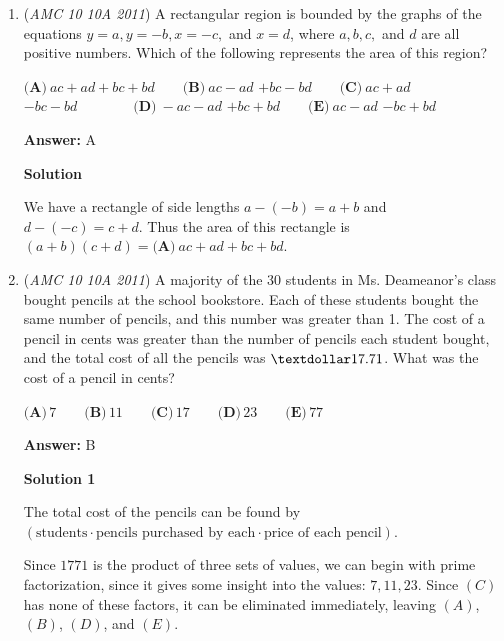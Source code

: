 \begin{enumerate}
 



\textbf{Solution 2}

WLOG, suppose there were 100 birds in total living on Town Lake, then 30 were geese, 25 were swans, 10 were herons, and 35 were ducks. $100-25 = 75$ of the birds are not swans and 30 of these are geese, so the answer is $\frac{30}{75} \times 100 = \boxed{40 \%(C)}$.

 


 


	\item (\textit{AMC 10 10A 2011}) A rectangular region is bounded by the graphs of the equations $y=a, y=-b, x=-c,$ and $x=d$, where $a,b,c,$ and $d$ are all positive numbers. Which of the following represents the area of this region?


 $\textbf{(A)}\ ac+ad+bc+bd\qquad\textbf{(B)}\ ac-ad$ $+bc-bd\qquad\textbf{(C)}\ ac+ad$ $-bc-bd   \quad\quad\qquad\textbf{(D)}\ -ac-ad$ $+bc+bd\qquad\textbf{(E)}\ ac-ad$ $-bc+bd$

 \textbf{Answer: }A



\textbf{Solution}

We have a rectangle of side lengths $a-(-b)=a+b$ and $d-(-c)=c+d.$ Thus the area of this rectangle is $(a + b)(c + d) = \boxed{\textbf{(A)}\ ac + ad + bc + bd}$.

 


	\item (\textit{AMC 10 10A 2011}) A majority of the 30 students in Ms. Deameanor's class bought pencils at the school bookstore.  Each of these students bought the same number of pencils, and this number was greater than 1.  The cost of a pencil in cents was greater than the number of pencils each student bought, and the total cost of all the pencils was $\textdollar 17.71$.  What was the cost of a pencil in cents?


 $\textbf{(A)}\,7 \qquad\textbf{(B)}\,11 \qquad\textbf{(C)}\,17 \qquad\textbf{(D)}\,23 \qquad\textbf{(E)}\,77$

 \textbf{Answer: }B



\textbf{Solution 1}

The total cost of the pencils can be found by $(\text{students}\cdot\text{pencils purchased by each}\cdot\text{price of each pencil})$.

 Since $1771$ is the product of three sets of values, we can begin with prime factorization, since it gives some insight into the values: $7, 11, 23$. Since $(C)$ has none of these factors, it can be eliminated immediately, leaving $(A)$, $(B)$, $(D)$, and $(E)$.


\end{enumerate}

